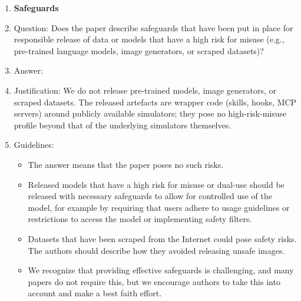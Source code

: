 \begin{enumerate}
\item {\bf Safeguards}
    \item[] Question: Does the paper describe safeguards that have been put in place for responsible release of data or models that have a high risk for misuse (e.g., pre-trained language models, image generators, or scraped datasets)?
    \item[] Answer: \answerNA{}
    \item[] Justification: We do not release pre-trained models, image generators, or scraped datasets. The released artefacts are wrapper code (skills, hooks, MCP servers) around publicly available simulators; they pose no high-risk-misuse profile beyond that of the underlying simulators themselves.
    \item[] Guidelines:
    \begin{itemize}
        \item The answer \answerNA{} means that the paper poses no such risks.
        \item Released models that have a high risk for misuse or dual-use should be released with necessary safeguards to allow for controlled use of the model, for example by requiring that users adhere to usage guidelines or restrictions to access the model or implementing safety filters.
        \item Datasets that have been scraped from the Internet could pose safety risks. The authors should describe how they avoided releasing unsafe images.
        \item We recognize that providing effective safeguards is challenging, and many papers do not require this, but we encourage authors to take this into account and make a best faith effort.
    \end{itemize}


\end{enumerate}
